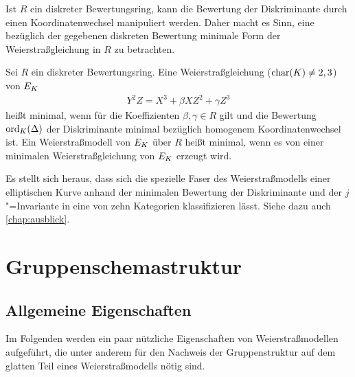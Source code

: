 Ist $R$ ein diskreter Bewertungsring, kann die Bewertung der
Diskriminante durch einen Koordinatenwechsel manipuliert werden. Daher
macht es Sinn, eine bezüglich der gegebenen diskreten Bewertung minimale
Form der Weierstraßgleichung in $R$ zu betrachten.
\begin{Definition}
  Sei $R$ ein diskreter Bewertungsring.
  Eine Weierstraßgleichung ($\operatorname{char}(K)\neq2,3$) von $E_{K}$
  \begin{gather*}
    Y^2Z = X^3 + \beta XZ^2 + \gamma Z^3
  \end{gather*}
  heißt minimal, wenn für die Koeffizienten ${\beta, \gamma\in R}$ gilt
  und die Bewertung $\operatorname{ord}_{K}(\Delta)$ der Diskriminante minimal
  bezüglich homogenem Koordinatenwechsel ist.
  Ein Weierstraßmodell von $E_{K}$ über $R$ heißt minimal,
  wenn es von einer minimalen Weierstraßgleichung von $E_{K}$ erzeugt
  wird.
\end{Definition}
Es stellt sich heraus, dass sich die spezielle Faser des
Weierstraßmodells einer elliptischen Kurve anhand der minimalen
Bewertung der Diskriminante und der $j$"=Invariante in eine von zehn
Kategorien klassifizieren lässt. Siehe dazu auch \autoref{chap:ausblick}. 


\section{Gruppenschemastruktur}\label{chap:weierstraßgruppe}
\subsection{Allgemeine Eigenschaften}
Im Folgenden werden ein paar nützliche Eigenschaften von
Weierstraßmodellen aufgeführt, die unter anderem für den Nachweis der
Gruppenstruktur auf dem glatten Teil eines Weierstraßmodells nötig
sind.

